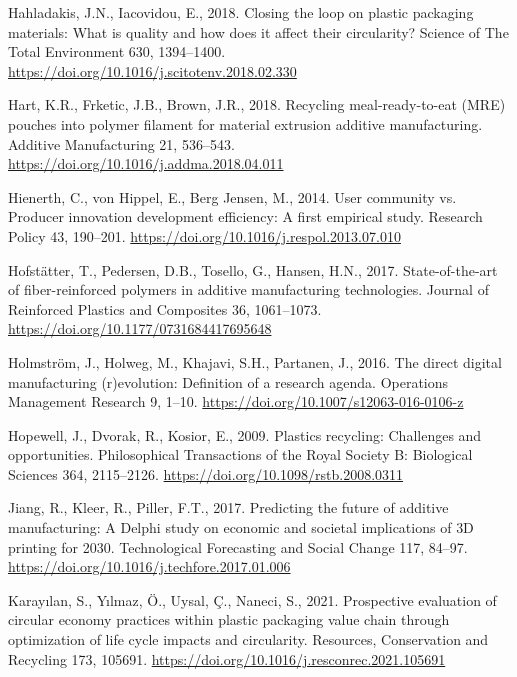 \documentclass[
  11pt,
]{article}
\newlength{\cslhangindent}
\newlength{\cslentryspacingunit} %
\newenvironment{CSLReferences}[2] %
 {%
  \setlength{\parindent}{0pt}
  \ifodd #1
  \let\oldpar\par
  \def\par{\hangindent=\cslhangindent\oldpar}
  \fi
  \setlength{\parskip}{#2\cslentryspacingunit}
 }%
 {}
\begin{document}
\begin{CSLReferences}{1}{0}
\leavevmode{}%
Hahladakis, J.N., Iacovidou, E., 2018. Closing the loop on plastic
packaging materials: {What} is quality and how does it affect their
circularity? Science of The Total Environment 630, 1394--1400.
\url{https://doi.org/10.1016/j.scitotenv.2018.02.330}

\leavevmode{}%
Hart, K.R., Frketic, J.B., Brown, J.R., 2018. Recycling
meal-ready-to-eat ({MRE}) pouches into polymer filament for material
extrusion additive manufacturing. Additive Manufacturing 21, 536--543.
\url{https://doi.org/10.1016/j.addma.2018.04.011}

\leavevmode{}%
Hienerth, C., von Hippel, E., Berg Jensen, M., 2014. User community vs.
Producer innovation development efficiency: {A} first empirical study.
Research Policy 43, 190--201.
\url{https://doi.org/10.1016/j.respol.2013.07.010}

\leavevmode{}%
Hofstätter, T., Pedersen, D.B., Tosello, G., Hansen, H.N., 2017.
State-of-the-art of fiber-reinforced polymers in additive manufacturing
technologies. Journal of Reinforced Plastics and Composites 36,
1061--1073. \url{https://doi.org/10.1177/0731684417695648}

\leavevmode{}%
Holmström, J., Holweg, M., Khajavi, S.H., Partanen, J., 2016. The direct
digital manufacturing (r)evolution: Definition of a research agenda.
Operations Management Research 9, 1--10.
\url{https://doi.org/10.1007/s12063-016-0106-z}

\leavevmode{}%
Hopewell, J., Dvorak, R., Kosior, E., 2009. Plastics recycling:
Challenges and opportunities. Philosophical Transactions of the Royal
Society B: Biological Sciences 364, 2115--2126.
\url{https://doi.org/10.1098/rstb.2008.0311}

\leavevmode{}%
Jiang, R., Kleer, R., Piller, F.T., 2017. Predicting the future of
additive manufacturing: {A Delphi} study on economic and societal
implications of {3D} printing for 2030. Technological Forecasting and
Social Change 117, 84--97.
\url{https://doi.org/10.1016/j.techfore.2017.01.006}

\leavevmode{}%
Karayılan, S., Yılmaz, Ö., Uysal, Ç., Naneci, S., 2021. Prospective
evaluation of circular economy practices within plastic packaging value
chain through optimization of life cycle impacts and circularity.
Resources, Conservation and Recycling 173, 105691.
\url{https://doi.org/10.1016/j.resconrec.2021.105691}


\end{CSLReferences}
\end{document}

